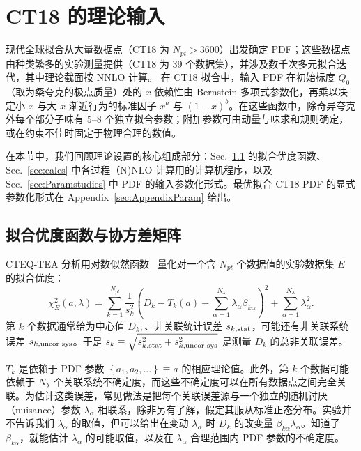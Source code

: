 \section{\label{sec:Theory} CT18 的理论输入
\label{sec:Theory}}

现代全球拟合从大量数据点（CT18 为 $N_\mathit{pt}\! >\! 3600$）出发确定 PDF；这些数据点由种类繁多的实验测量提供（CT18 为 39 个数据集），并涉及数千次多元拟合迭代，其中理论截面按 NNLO 计算。
在 CT18 拟合中，输入 PDF 在初始标度 $Q_0$（取为粲夸克的极点质量）处的 $x$ 依赖性由 Bernstein 多项式参数化，再乘以决定小 $x$ 与大 $x$ 渐近行为的标准因子 $x^a$ 与 $(1-x)^b$。在这些函数中，除奇异夸克外每个部分子味有 5--8 个独立拟合参数；附加参数可由动量与味求和规则确定，或在约束不佳时固定于物理合理的数值。

在本节中，我们回顾理论设置的核心组成部分：Sec.~\ref{sec:chi2} 的拟合优度函数、Sec.~\ref{sec:calcs} 中各过程（N)NLO 计算用的计算机程序，以及 Sec.~\ref{sec:Paramstudies} 中 PDF 的输入参数化形式。最优拟合 CT18 PDF 的显式参数化形式在 Appendix~\ref{sec:AppendixParam} 给出。

\subsection{拟合优度函数与协方差矩阵}
\label{sec:chi2}
CTEQ-TEA 分析用对数似然函数~\cite{Pumplin:2002vw} 量化对一个含 $N_{pt}$ 个数据值的实验数据集 $E$ 的拟合优度：
\begin{equation}
\chi_{E}^{2}(a,\lambda)=\sum_{k=1}^{N_{pt}}\frac{1}{s_{k}^{2}}\left(D_{k}-T_{k}(a)-\sum_{\alpha=1}^{N_{\lambda}}\lambda_{\alpha}\beta_{k\alpha}\right)^{2}+\sum_{\alpha=1}^{N_{\lambda}}\lambda_{\alpha}^{2}.\label{Chi2sys}
\end{equation}
第 $k$ 个数据通常给为中心值 $D_{k},$、非关联统计误差 $s_{k,\mbox{\scriptsize stat}}$，可能还有非关联系统误差 $s_{k,\mbox{\scriptsize uncor sys}}$。于是 $s_{k}\equiv \sqrt{s_{k,\mbox{\scriptsize stat}}^{2}+s_{k,\mbox{\scriptsize uncor sys}}^{2}}$ 是测量 $D_{k}$ 的总非关联误差。

$T_{k}$ 是依赖于 PDF 参数 $\left\{a_1,a_2,...\right\}\equiv a$ 的相应理论值。此外，第 $k$ 个数据可能依赖于 $N_{\lambda}$ 个关联系统不确定度，而这些不确定度可以在所有数据点之间完全关联。为估计这类误差，常见做法是把每个关联误差源与一个独立的随机讨厌（nuisance）参数 $\lambda_{\alpha}$ 相联系，除非另有了解，假定其服从标准正态分布。实验并不告诉我们 $\lambda_{\alpha}$ 的取值，但可以给出在变动 $\lambda_{\alpha}$ 时 $D_k$ 的改变量 $\beta_{k\alpha}\lambda_\alpha$。知道了 $\beta_{k\alpha}$，就能估计 $\lambda_{\alpha}$ 的可能取值，以及在 $\lambda_{\alpha}$ 合理范围内 PDF 参数的不确定度。


